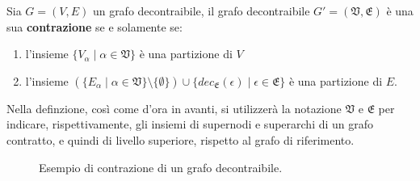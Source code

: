     \begin{definition}
        Sia $G = (V, E)$ un grafo decontraibile, il grafo decontraibile
        $G\mathcal{'} = (\mathfrak{V}, \mathfrak{E})$ \`e una sua \textbf{contrazione} se e solamente se:
            \begin{enumerate}
                \item l'insieme $\{V_\alpha \mid \alpha \in \mathfrak{V}\}$ \`e una partizione di $V$
                \item l'insieme $(\{E_\alpha \mid \alpha \in \mathfrak{V}\} \setminus \{ \emptyset \}) \cup
                    \{ dec_{\mathfrak{E}}(\epsilon) \mid \epsilon \in \mathfrak{E}\}$ \`e una partizione di $E$.
            \end{enumerate}
    \end{definition}

    Nella definzione, cos\`{i} come d'ora in avanti, si utilizzer\`a la notazione $\mathfrak{V}$ e $\mathfrak{E}$ per
    indicare, rispettivamente, gli insiemi di supernodi e superarchi di un grafo contratto, e quindi di livello
    superiore, rispetto al grafo di riferimento.

    \begin{figure}[H]
          \centering
          \caption{Esempio di contrazione di un grafo decontraibile.}
          \label{fig:contraction-example}
      \end{figure}

